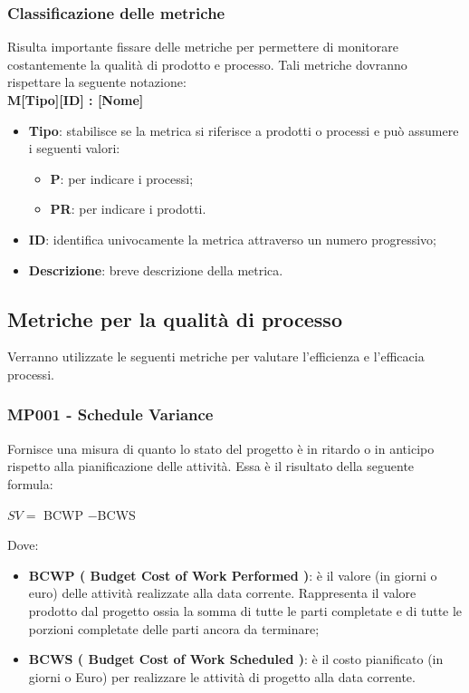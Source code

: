 \subsubsection{Classificazione delle metriche}
Risulta importante fissare delle metriche per permettere di monitorare costantemente la qualità di prodotto e processo. Tali metriche dovranno rispettare la seguente notazione:\\
\textbf{M[Tipo][ID] : [Nome]}
\begin{itemize}
	\item \textbf{Tipo}: stabilisce se la metrica si riferisce a prodotti o processi e può assumere i seguenti valori:
	\begin{itemize}
		\item \textbf{P}: per indicare i processi;
		\item \textbf{PR}: per indicare i prodotti.
	\end{itemize}
	\item \textbf{ID}: identifica univocamente la metrica attraverso un numero progressivo;
	\item \textbf{Descrizione}: breve descrizione della metrica.
\end{itemize}

\subsection{Metriche per la qualità di processo}\label{processo}
Verranno utilizzate le seguenti metriche per valutare l'efficienza e l'efficacia 
processi.

\subsubsection{MP001 - Schedule Variance}
Fornisce una misura di quanto lo stato del progetto è in ritardo o in anticipo rispetto alla pianificazione delle attività.
Essa è il risultato della seguente formula:\\
\begin{center}
	$SV = ${ BCWP} $-${BCWS}
\end{center}
Dove:
\begin{itemize}
	\item \textbf{ BCWP ( Budget Cost of Work Performed )}: è il valore (in giorni o euro) delle attività realizzate alla data corrente. Rappresenta il valore prodotto dal progetto ossia la somma di tutte le parti completate e di tutte le porzioni completate delle parti ancora da terminare;
	\item \textbf{ BCWS ( Budget Cost of Work Scheduled )}: è il costo pianificato (in giorni o Euro) per realizzare le attività di progetto alla data corrente.
\end{itemize}

